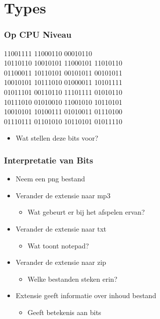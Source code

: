 \section{Types}

\frame{\tableofcontents[currentsection]}

\begin{frame}
  \frametitle{Op CPU Niveau}
  \begin{center}  11001111 11000110 00010110 \\
    10110110 10010101 11000101 11010110 \\
    01100011 10110101 00101011 00101011 \\
    10010101 10111010 01000011 10101111 \\
    01011101 00110110 11101111 01010110 \\
    10111010 01010010 11001010 10110101 \\
    10010101 10100111 01010011 01110100 \\
    01110111 01101010 10110101 01011110 \\
  \end{center}
  \begin{itemize}
    \item Wat stellen deze bits voor?
  \end{itemize}
\end{frame}

\begin{frame}
  \frametitle{Interpretatie van Bits}
  \begin{itemize}
    \item Neem een png bestand
    \item Verander de extensie naar mp3
          \begin{itemize}
            \item Wat gebeurt er bij het afspelen ervan?
          \end{itemize}
    \item Verander de extensie naar txt
          \begin{itemize}
            \item Wat toont notepad?
          \end{itemize}
    \item Verander de extensie naar zip
          \begin{itemize}
            \item Welke bestanden steken erin?
          \end{itemize}
    \item Extensie geeft informatie over inhoud bestand
          \begin{itemize}
            \item Geeft betekenis aan bits
          \end{itemize}
  \end{itemize}
\end{frame}


